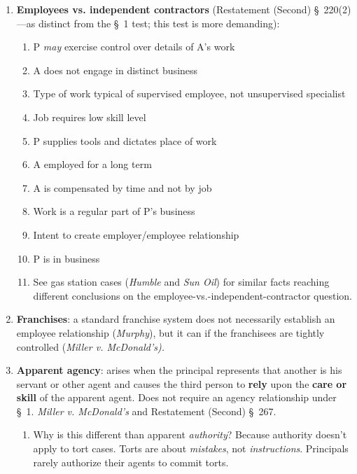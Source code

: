 \begin{enumerate}
\begin{enumerate}
        \item \textbf{Employees vs. independent contractors} (Restatement 
        (Second) \S\ 220(2)---as distinct from the \S\ 1 test; this test is 
        more demanding):
        \begin{enumerate}
            \item P \emph{may} exercise control over details of A’s work
            \item A does not engage in distinct business
            \item Type of work typical of supervised employee, not unsupervised specialist
            \item Job requires low skill level
            \item P supplies tools and dictates place of work
            \item A employed for a long term
            \item A is compensated by time and not by job
            \item Work is a regular part of P’s business
            \item Intent to create employer/employee relationship
            \item P is in business
            \item See gas station cases (\emph{Humble} and \emph{Sun Oil}) for 
            similar facts reaching different conclusions on the 
            employee-vs.-independent-contractor question.
        \end{enumerate}
        \item \textbf{Franchises}: a standard franchise system does not 
        necessarily establish an employee relationship (\emph{Murphy}), but it 
        can if the franchisees are tightly controlled (\emph{Miller v. McDonald's).}
        \item \textbf{Apparent agency}: arises when the principal represents 
        that another is his servant or other agent and causes the third person 
        to \textbf{rely} upon the \textbf{care or skill} of the apparent 
        agent. Does not require an agency relationship under \S\ 1.  
        \emph{Miller v. McDonald's} and Restatement (Second) \S\ 267.
        \begin{enumerate}
            \item Why is this different than apparent \emph{authority}? Because 
            authority doesn't apply to tort cases. Torts are about 
            \emph{mistakes}, not \emph{instructions}. Principals rarely 
            authorize their agents to commit torts.

\end{enumerate}
\end{enumerate}
\end{enumerate}
